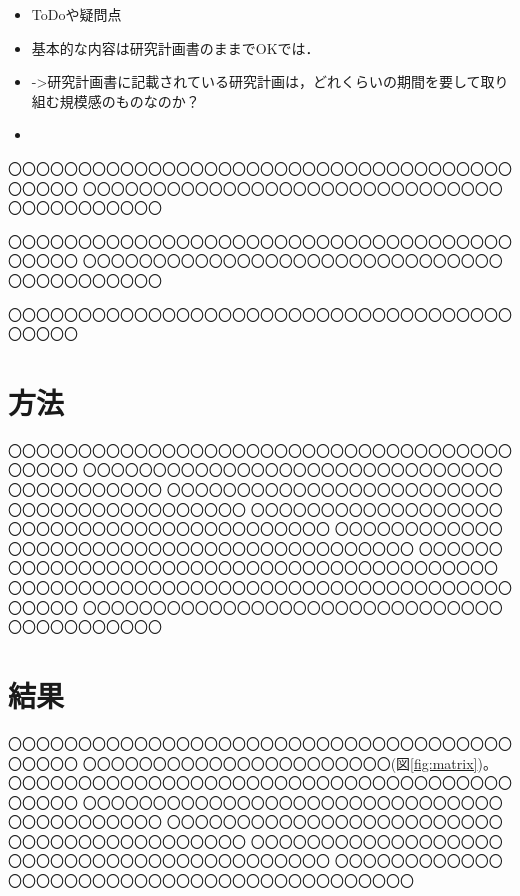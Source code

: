 \documentclass[dvipdfmx, A4j, twocolumn, 10.5pt]{jsarticle}
\begin{document}
\iffalse


\begin{itemize}
 \item ToDoや疑問点
 \item 基本的な内容は研究計画書のままでOKでは．
 \item ->研究計画書に記載されている研究計画は，どれくらいの期間を要して取り組む規模感のものなのか？
 \item 
\end{itemize}

〇〇〇〇〇〇〇〇〇〇〇〇〇〇〇〇〇〇〇〇〇〇〇〇〇〇〇〇〇〇〇〇〇〇〇〇〇〇〇〇〇
〇〇〇〇〇〇〇〇〇〇〇〇〇〇〇〇〇〇〇〇〇〇〇〇〇〇〇〇〇〇〇〇〇〇〇〇〇〇〇〇〇

〇〇〇〇〇〇〇〇〇〇〇〇〇〇〇〇〇〇〇〇〇〇〇〇〇〇〇〇〇〇〇〇〇〇〇〇〇〇〇〇〇
〇〇〇〇〇〇〇〇〇〇〇〇〇〇〇〇〇〇〇〇〇〇〇〇〇〇〇〇〇〇〇〇〇〇〇〇〇〇〇〇〇

〇〇〇〇〇〇〇〇〇〇〇〇〇〇〇〇〇〇〇〇〇〇〇〇〇〇〇〇〇〇〇〇〇〇〇〇〇〇〇〇〇

\section{方法}
〇〇〇〇〇〇〇〇〇〇〇〇〇〇〇〇〇〇〇〇〇〇〇〇〇〇〇〇〇〇〇〇〇〇〇〇〇〇〇〇〇
〇〇〇〇〇〇〇〇〇〇〇〇〇〇〇〇〇〇〇〇〇〇〇〇〇〇〇〇〇〇〇〇〇〇〇〇〇〇〇〇〇
〇〇〇〇〇〇〇〇〇〇〇〇〇〇〇〇〇〇〇〇〇〇〇〇〇〇〇〇〇〇〇〇〇〇〇〇〇〇〇〇〇
〇〇〇〇〇〇〇〇〇〇〇〇〇〇〇〇〇〇〇〇〇〇〇〇〇〇〇〇〇〇〇〇〇〇〇〇〇〇〇〇〇
〇〇〇〇〇〇〇〇〇〇〇〇〇〇〇〇〇〇〇〇〇〇〇〇〇〇〇〇〇〇〇〇〇〇〇〇〇〇〇〇〇
〇〇〇〇〇〇〇〇〇〇〇〇〇〇〇〇〇〇〇〇〇〇〇〇〇〇〇〇〇〇〇〇〇〇〇〇〇〇〇〇〇
〇〇〇〇〇〇〇〇〇〇〇〇〇〇〇〇〇〇〇〇〇〇〇〇〇〇〇〇〇〇〇〇〇〇〇〇〇〇〇〇〇
〇〇〇〇〇〇〇〇〇〇〇〇〇〇〇〇〇〇〇〇〇〇〇〇〇〇〇〇〇〇〇〇〇〇〇〇〇〇〇〇〇

\section{結果}
〇〇〇〇〇〇〇〇〇〇〇〇〇〇〇〇〇〇〇〇〇〇〇〇〇〇〇〇〇〇〇〇〇〇〇〇〇〇〇〇〇
〇〇〇〇〇〇〇〇〇〇〇〇〇〇〇〇〇〇〇〇〇〇(図\ref{fig:matrix})。
〇〇〇〇〇〇〇〇〇〇〇〇〇〇〇〇〇〇〇〇〇〇〇〇〇〇〇〇〇〇〇〇〇〇〇〇〇〇〇〇〇
〇〇〇〇〇〇〇〇〇〇〇〇〇〇〇〇〇〇〇〇〇〇〇〇〇〇〇〇〇〇〇〇〇〇〇〇〇〇〇〇〇
〇〇〇〇〇〇〇〇〇〇〇〇〇〇〇〇〇〇〇〇〇〇〇〇〇〇〇〇〇〇〇〇〇〇〇〇〇〇〇〇〇
〇〇〇〇〇〇〇〇〇〇〇〇〇〇〇〇〇〇〇〇〇〇〇〇〇〇〇〇〇〇〇〇〇〇〇〇〇〇〇〇〇
〇〇〇〇〇〇〇〇〇〇〇〇〇〇〇〇〇〇〇〇〇〇〇〇〇〇〇〇〇〇〇〇〇〇〇〇〇〇〇〇〇
\end{document}
